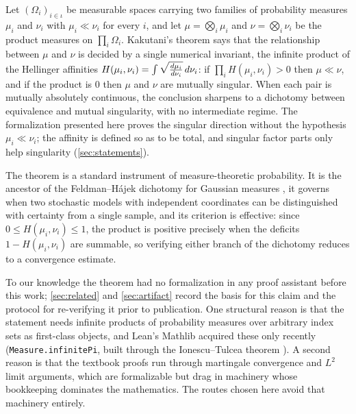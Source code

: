 \documentclass[a4paper,UKenglish,autoref,thm-restate]{lipics-v2021}
\newcommand{\leanid}[1]{{\def\_{\textunderscore\allowbreak}\texttt{#1}}}
\begin{document}
Let $(\Omega_i)_{i \in \iota}$ be measurable spaces carrying two families of
probability measures $\mu_i$ and $\nu_i$ with $\mu_i \ll \nu_i$ for every $i$,
and let $\mu = \bigotimes_i \mu_i$ and $\nu = \bigotimes_i \nu_i$ be the product
measures on $\prod_i \Omega_i$. Kakutani's theorem \cite{kakutani1948} says
that the relationship between $\mu$ and $\nu$ is decided by a single numerical
invariant, the infinite product of the Hellinger affinities
$H(\mu_i, \nu_i) = \int \sqrt{\smash[b]{\tfrac{d\mu_i}{d\nu_i}}}\, d\nu_i$: if
$\prod_i H(\mu_i,\nu_i) > 0$ then $\mu \ll \nu$, and if the product is $0$ then
$\mu$ and $\nu$ are mutually singular. When each pair is mutually absolutely
continuous, the conclusion sharpens to a dichotomy between equivalence and
mutual singularity, with no intermediate regime. The formalization presented
here proves the singular direction without the hypothesis $\mu_i \ll \nu_i$;
the affinity is defined so as to be total, and singular factor parts only help
singularity (\autoref{sec:statements}).

The theorem is a standard instrument of measure-theoretic probability. It is
the ancestor of the Feldman--H\'ajek dichotomy for Gaussian measures
\cite{feldman1958,hajek1958}, it governs when two stochastic models with
independent coordinates can be distinguished with certainty from a single
sample, and its criterion is effective: since $0 \le H(\mu_i,\nu_i) \le 1$, the
product is positive precisely when the deficits $1 - H(\mu_i,\nu_i)$ are
summable, so verifying either branch of the dichotomy reduces to a convergence
estimate.

To our knowledge the theorem had no formalization in any proof assistant before
this work; \autoref{sec:related} and \autoref{sec:artifact} record the basis
for this claim and the protocol for re-verifying it prior to publication. One
structural reason is that the statement needs infinite products of probability
measures over arbitrary index sets as first-class objects, and Lean's Mathlib
\cite{mathlib2020,demoura2021} acquired these only recently
(\leanid{Measure.infinitePi}, built through the Ionescu--Tulcea theorem
\cite{ionescutulcea1949}). A second reason is that the textbook proofs
\cite{williams1991} run through martingale convergence and $L^2$ limit
arguments, which are formalizable but drag in machinery whose bookkeeping
dominates the mathematics. The routes chosen here avoid that machinery
entirely.
\end{document}
